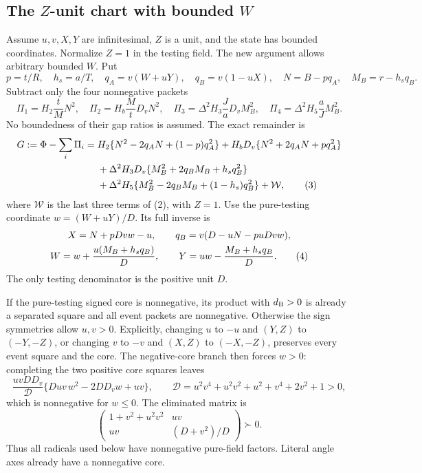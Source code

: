 \subsection*{The \texorpdfstring{$Z$}{Z}-unit chart with bounded \texorpdfstring{$W$}{W}}

Assume $u,v,X,Y$ are infinitesimal, $Z$ is a unit, and the state has
bounded coordinates. Normalize $Z=1$ in the testing field. The new
argument allows arbitrary bounded $W$. Put
\[
 p=t/R,\quad h_s=a/T,\quad q_A=v(W+uY),\quad q_B=v(1-uX),
 \quad N=B-pq_A,\quad M_B=r-h_sq_B.
\]
Subtract only the four nonnegative packets
\[
 \Pi_1=H_2\frac tM N^2,\quad \Pi_2=H_b\frac MtD_vN^2,
 \quad \Pi_3=\Delta^2H_3\frac JaD_vM_B^2,
 \quad \Pi_4=\Delta^2H_5\frac aJM_B^2.
\]
No boundedness of their gap ratios is assumed. The exact remainder is
\begin{align}
 G:=\Phi-\sum_i\Pi_i={}&H_2\{N^2-2q_AN+(1-p)q_A^2\}
 +H_bD_v\{N^2+2q_AN+pq_A^2\}\notag\\
 &+\Delta^2H_3D_v\{M_B^2+2q_BM_B+h_sq_B^2\}\notag\\
 &+\Delta^2H_5\{M_B^2-2q_BM_B+(1-h_s)q_B^2\}
 +\mathcal W,                                                   \tag{3}
\end{align}
where $\mathcal W$ is the last three terms of (2), with $Z=1$.
Use the pure-testing coordinate $w=(W+uY)/D$. Its full inverse is
\begin{gather}
 X=N+pDvw-u,\qquad q_B=v(D-uN-puDvw),\notag\\
 W=w+\frac{u(M_B+h_sq_B)}D,\qquad
 Y=uw-\frac{M_B+h_sq_B}D.                               \tag{4}
\end{gather}
The only testing denominator is the positive unit $D$.

If the pure-testing signed core is nonnegative, its product with
$d_{\rm B}>0$ is already a separated square and all event packets are
nonnegative. Otherwise the sign symmetries allow $u,v>0$. Explicitly,
changing $u$ to $-u$ and $(Y,Z)$ to $(-Y,-Z)$, or changing $v$ to
$-v$ and $(X,Z)$ to $(-X,-Z)$, preserves every event square and the
core. The negative-core branch then forces $w>0$: completing the two
positive core squares leaves
\[
 \frac{uvDD_v}{\mathcal D}
 \{D u v\,w^2-2DD_vw+uv\},\qquad
 \mathcal D=u^2v^4+u^2v^2+u^2+v^4+2v^2+1>0,
\]
which is nonnegative for $w\leq0$. The eliminated matrix is
\[
 \begin{pmatrix}1+v^2+u^2v^2&uv\\uv&(D+v^2)/D\end{pmatrix}\succ0.
\]
Thus all radicals used below have nonnegative pure-field factors.
Literal angle axes already have a nonnegative core.

